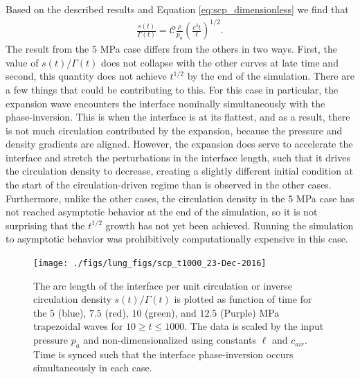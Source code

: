 \documentclass{jfm}%
\begin{document}
Based on the described results and Equation \eqref{eq:scp_dimensionless} we find that 
\begin{align}
  \label{eq:scp_relationship}
  \frac{s(t)}{\Gamma(t)} = \mathcal{C}\frac{\rho}{p_a}\left(\frac{c^3t}{\ell}\right)^{1/2}.
\end{align}
The result from the $5$ MPa case differs from the others in
two ways. First, the value of $s(t)/\Gamma(t)$ does not collapse with
the other curves at late time and second, this quantity does not
achieve $t^{1/2}$ by the end of the simulation. There are a few things
that could be contributing to this. For this case in particular, the
expansion wave encounters the interface nominally simultaneously with
the phase-inversion. This is when the interface is at its flattest,
and as a result, there is not much circulation contributed by the
expansion, because the pressure and density gradients are
aligned. However, the expansion does serve to accelerate the interface
and stretch the perturbations in the interface length, such that it
drives the circulation density to decrease, creating a slightly
different initial condition at the start of the circulation-driven
regime than is observed in the other cases. Furthermore, unlike the
other cases, the circulation density in the $5$ MPa case has not
reached asymptotic behavior at the end of the simulation, so it is not
surprising that the $t^{1/2}$ growth has not yet been
achieved. Running the simulation to asymptotic behavior was
prohibitively computationally expensive in this case.

\begin{figure}
  \centering
  \texttt{[image: ./figs/lung\_figs/scp\_t1000\_23-Dec-2016]}
  \caption[The interface arc length at long times]{The arc length of
    the interface per unit circulation or inverse circulation density
    $s(t)/\Gamma(t)$ is plotted as function of time for the $5$
    (blue), $7.5$ (red), $10$ (green), and $12.5$ (Purple) MPa
    trapezoidal waves for $10\geq t\leq 1000$. The data is scaled by
    the input pressure $p_a$ and non-dimensionalized using constants
    $\ell$ and $c_{air}$. Time is synced such that the interface
    phase-inversion occurs simultaneously in each case.}
  \label{fig:trapz_scp_t1000}
\end{figure}
% 
\end{document}
